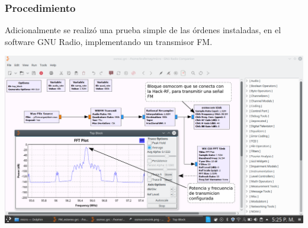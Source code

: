 \begin{frame}
\frametitle{Procedimiento}

Adicionalmente se realizó una prueba simple de las órdenes instaladas, en el software GNU Radio, implementando un transmisor FM.  

\begin{center}
\vspace{-0.3cm}
\includegraphics[width=\textwidth]{parte2/lab6/pdf/lab6_1.pdf}
\end{center}


\end{frame}
